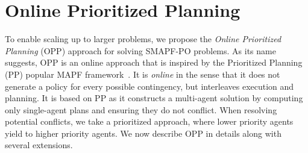 \documentclass[letterpaper]{article} %
\newcommand{\plan}[1]{{\textcolor{blue}{[Plan: #1]}}}
\newcommand{\inon}[1]{ }
\begin{document}
\section{Online Prioritized Planning}
\label{sec:online}



To enable scaling up to larger problems, we propose the \emph{Online Prioritized Planning} (OPP) approach for solving SMAPF-PO problems. 
As its name suggests, OPP is an online approach that is inspired by the Prioritized Planning (PP) popular MAPF framework~\cite{silver2005cooperative}. 
It is \emph{online} in the sense that it does not generate a policy for every possible contingency, but interleaves execution and planning. 
It is based on PP as it constructs a multi-agent solution by computing only single-agent plans 
and ensuring they do not conflict. When resolving potential conflicts, we take a prioritized approach, where lower priority agents yield to higher priority agents.
We now describe OPP in details along with several extensions.  


\end{document}
